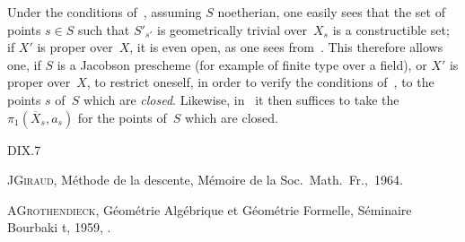 \begin{remark}
\label{IX.6.12}
Under the conditions of~, assuming $S$ noetherian, one
easily sees that the set of points $s\in S$ such that $S'_{s'}$ is
geometrically trivial over~$X_s$ is a constructible set; if $X'$ is
proper over~$X$, it is even open, as one sees from~. This
therefore allows one, if $S$ is a Jacobson prescheme (for example of
finite type over a field), or
$X'$ is proper over~$X$, to restrict oneself, in order to verify the
conditions of~, to the points $s$ of~$S$ which are
\emph{closed}. Likewise, in~ it then suffices to take the
$\pi_1(\overline X_s,a_s)$ for the points of~$S$ which are closed.
\end{remark}

\begin{thebibliography}{D}{IX.7}

 J\ptbl \textsc{Giraud}, M\'ethode de la
descente,
M\'emoire 
de la Soc.\ Math.\ Fr.,~1964.

 A\ptbl \textsc{Grothendieck}, G\'eom\'etrie Alg\'ebrique et
G\'eom\'etrie Formelle, S\'eminaire Bourbaki t, 1959,
.
\end{thebibliography}
